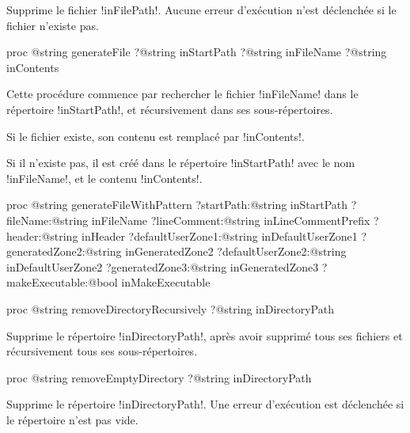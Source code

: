 Supprime le fichier \ggsq!inFilePath!. Aucune erreur d'exécution n'est déclenchée si le fichier n'existe pas.








\begin{galgas4box}
proc @string generateFile
   ?@string inStartPath
   ?@string inFileName
   ?@string inContents
\end{galgas4box}

Cette procédure commence par rechercher le fichier \ggsq!inFileName! dans le répertoire \ggsq!inStartPath!, et récursivement dans ses sous-répertoires.

Si le fichier existe, son contenu est remplacé par \ggsq!inContents!.

Si il n'existe pas, il est créé dans le répertoire \ggsq!inStartPath! avec le nom \ggsq!inFileName!, et le contenu \ggsq!inContents!.










\begin{galgas4box}
proc @string generateFileWithPattern
   ?startPath:@string inStartPath
   ?fileName:@string inFileName
   ?lineComment:@string inLineCommentPrefix
   ?header:@string inHeader
   ?defaultUserZone1:@string inDefaultUserZone1
   ?generatedZone2:@string inGeneratedZone2
   ?defaultUserZone2:@string inDefaultUserZone2
   ?generatedZone3:@string inGeneratedZone3
   ?makeExecutable:@bool inMakeExecutable
\end{galgas4box}








\begin{galgas4box}
proc @string removeDirectoryRecursively ?@string inDirectoryPath
\end{galgas4box}

Supprime le répertoire \ggsq!inDirectoryPath!, après avoir supprimé tous ses fichiers et récursivement tous ses sous-répertoires.









\begin{galgas4box}
proc @string removeEmptyDirectory ?@string inDirectoryPath
\end{galgas4box}

Supprime le répertoire \ggsq!inDirectoryPath!. Une erreur d'exécution est déclenchée si le répertoire n'est pas vide.


